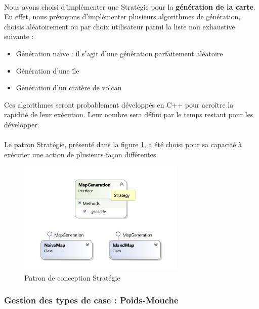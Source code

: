\paragraph{}
Nous avons choisi d'implémenter une Stratégie pour la \textbf{génération de la carte}.
En effet, nous prévoyons d'implémenter plusieurs algorithmes de génération, choisis aléatoirement ou par choix utilisateur parmi la liste non exhaustive suivante :

\begin{itemize}
  \item Génération naïve : il s'agit d'une génération parfaitement aléatoire
  \item Génération d'une île
  \item Génération d'un cratère de volcan
\end{itemize}

Ces algorithmes seront probablement développés en C++ pour acroître la rapidité de leur exécution.
Leur nombre sera défini par le temps restant pour les développer.

\paragraph{}
Le patron Stratégie, présenté dans la figure \ref{fig:strategy}, a été choisi pour sa capacité à exécuter une action de plusieurs façon différentes.

\begin{figure}
  \centering
  \includegraphics[width=8cm]{schemas/dp_strategy.png}
  \caption{Patron de conception Stratégie}
  \label{fig:strategy}
\end{figure}

\subsubsection{Gestion des types de case : Poids-Mouche}

